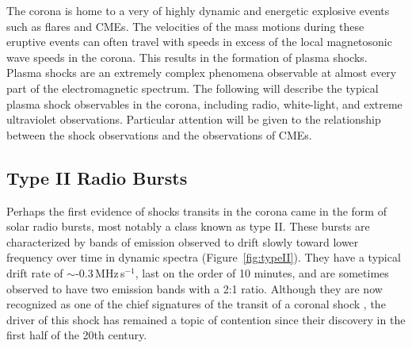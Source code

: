 The corona is home to a very of highly dynamic and energetic explosive events such as flares and CMEs. The velocities of the mass motions during these eruptive events can often travel with speeds in excess of the local magnetosonic wave speeds in the corona. This results in the formation of plasma shocks. Plasma shocks are an extremely complex phenomena observable at almost every part of the electromagnetic spectrum. The following will describe the typical plasma shock observables in the corona, including radio, white-light, and extreme ultraviolet observations. Particular attention will be given to the relationship between the shock observations and the observations of CMEs.

\subsection{Type II Radio Bursts}
Perhaps the first evidence of shocks transits in the corona came in the form of solar radio bursts, most notably a class known as type II. These bursts are characterized by bands of emission observed to drift slowly toward lower frequency over time in dynamic spectra (Figure~\ref{fig:typeII}). They have a typical drift rate of $\sim$-0.3\,MHz\,s$^{-1}$, last on the order of 10 minutes, and are sometimes observed to have two emission bands with a 2:1 ratio. Although they are now recognized as one of the chief signatures of the transit of a coronal shock \citep{nelson1985, mann1996}, the driver of this shock has remained a topic of contention since their discovery in the first half of the 20th century.

